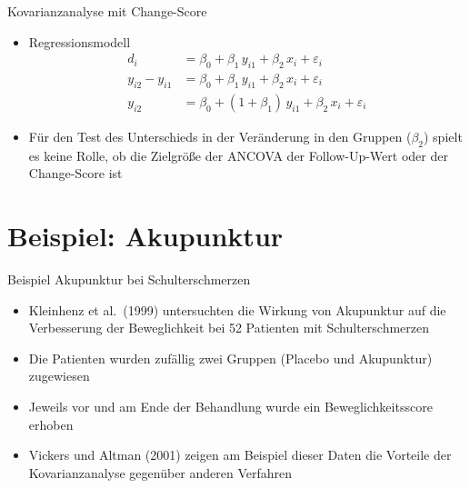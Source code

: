 \documentclass{beamer}
\begin{document}
\begin{frame}{Kovarianzanalyse mit Change-Score}
\begin{itemize}
  \item Regressionsmodell
    {\color{iwmorange}\begin{align*}
                  d_i &= \beta_0 + \beta_1 \, y_{i1} + \beta_2 \, x_i + \varepsilon_i \\
      y_{i2} - y_{i1} &= \beta_0 + \beta_1 \, y_{i1} + \beta_2 \, x_i + \varepsilon_i \\
               y_{i2} &= \beta_0 + (1 + \beta_1) \, y_{i1} + \beta_2 \, x_i + \varepsilon_i
    \end{align*}}
  \item Für den Test des Unterschieds in der Veränderung in den Gruppen ($\beta_2$) spielt es keine Rolle, ob die Zielgröße der ANCOVA der Follow-Up-Wert oder der Change-Score ist
  \vfill
\end{itemize}
\end{frame}


\section{Beispiel: Akupunktur}


\begin{frame}{Beispiel}
Akupunktur bei Schulterschmerzen
\begin{itemize}
  \item Kleinhenz et al.\ (1999) untersuchten die Wirkung von Akupunktur auf die Verbesserung der Beweglichkeit bei 52 Patienten mit Schulterschmerzen
  \item Die Patienten wurden zufällig zwei Gruppen (Placebo und Akupunktur) zugewiesen
  \item Jeweils vor und am Ende der Behandlung wurde ein Beweglichkeitsscore erhoben
  \item Vickers und Altman (2001) zeigen am Beispiel dieser Daten die Vorteile der Kovarianzanalyse gegenüber anderen Verfahren
\end{itemize}
\end{frame}
\end{document}
